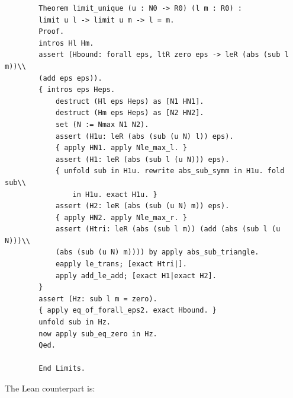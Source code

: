 \documentclass{article}
\theoremstyle{plain}
\theoremstyle{definition}
\theoremstyle{remark}
\begin{document}
\begin{verbatim}
		Theorem limit_unique (u : N0 -> R0) (l m : R0) :
		limit u l -> limit u m -> l = m.
		Proof.
		intros Hl Hm.
		assert (Hbound: forall eps, ltR zero eps -> leR (abs (sub l m))\\
		(add eps eps)).
		{ intros eps Heps.
			destruct (Hl eps Heps) as [N1 HN1].
			destruct (Hm eps Heps) as [N2 HN2].
			set (N := Nmax N1 N2).
			assert (H1u: leR (abs (sub (u N) l)) eps).
			{ apply HN1. apply Nle_max_l. }
			assert (H1: leR (abs (sub l (u N))) eps).
			{ unfold sub in H1u. rewrite abs_sub_symm in H1u. fold sub\\
				in H1u. exact H1u. }
			assert (H2: leR (abs (sub (u N) m)) eps).
			{ apply HN2. apply Nle_max_r. }
			assert (Htri: leR (abs (sub l m)) (add (abs (sub l (u N)))\\
			(abs (sub (u N) m)))) by apply abs_sub_triangle.
			eapply le_trans; [exact Htri|].
			apply add_le_add; [exact H1|exact H2].
		}
		assert (Hz: sub l m = zero).
		{ apply eq_of_forall_eps2. exact Hbound. }
		unfold sub in Hz.
		now apply sub_eq_zero in Hz.
		Qed.
		
		End Limits.
	\end{verbatim}
	
	The Lean counterpart is:
	
\end{document}

